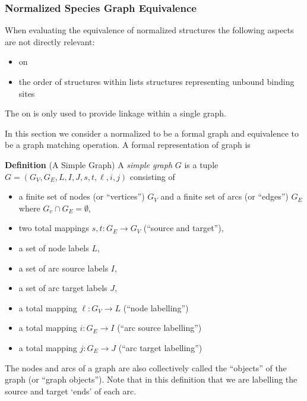 \documentclass{cekarticle}
\begin{document}
\subsubsection{Normalized Species Graph Equivalence}
\label{sec:match-graphs}

When evaluating the equivalence of normalized 
structures the following aspects are not directly relevant:
\begin{itemize}
\item {} on 

\item the order of structures within lists 
structures representing unbound binding sites
\end{itemize}

The  on  is only used to provide linkage within a single
graph.

In this section we consider a normalized  to
be a formal graph and equivalence to be a graph matching
operation. A formal representation of graph is

\textbf{Definition} (A Simple Graph) A \emph{simple graph} $G$ is a
tuple $G = (G_{V}, G_{E}, L, I, J, s, t, \ell, i, j)$
consisting of
\begin{itemize}

\item a finite set of nodes (or ``vertices'') $G_{V}$ and a finite set of arcs (or ``edges'') $G_{E}$
        where $G_{v} \cap G_{E} = \emptyset$,

\item two total mappings $s, t : G_{E} \rightarrow G_{V}$ (``source and target''),

\item a set of node labels $L$,

\item a set of arc source labels $I$,

\item a set of arc target labels $J$,

\item a total mapping $\ell : G_{V} \rightarrow L$ (``node labelling'')

\item a total mapping $i : G_{E} \rightarrow I$ (``arc source labelling'')

\item a total mapping $j : G_{E} \rightarrow J$ (``arc target labelling'')

\end{itemize}
The nodes and arcs of a graph are also collectively called the
``objects'' of the graph (or ``graph objects'').  Note that in
this definition that we are labelling the source and target `ends'
of each arc.
\end{document}
